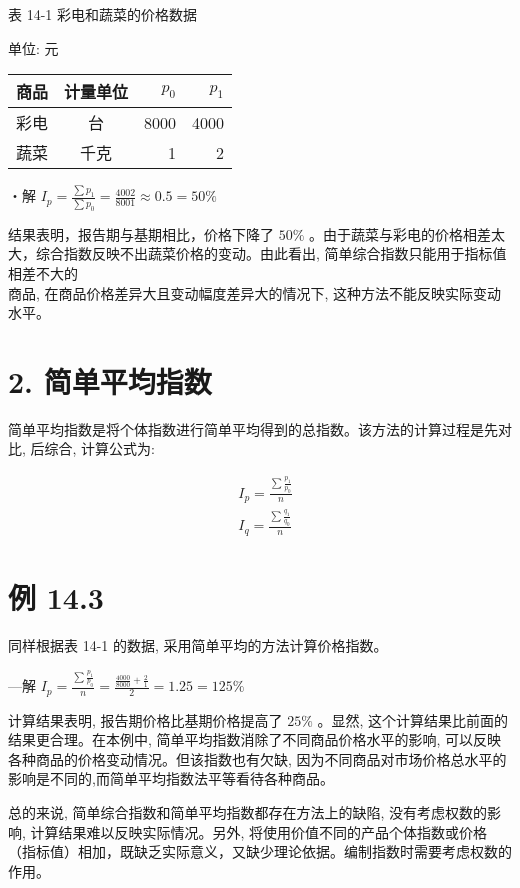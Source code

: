 \documentclass[10pt]{article}
\begin{document}
\begin{CJK*}{UTF8}{bsmi}
表 14-1 彩电和蔬菜的价格数据

单位: 元

\begin{center}
\begin{tabular}{rcrr}
\hline
商品 & 计量单位 & $p_{0}$ & $p_{1}$ \\
\hline
彩电 & 台 & 8000 & 4000 \\
蔬菜 & 千克 & 1 & 2 \\
\hline
\end{tabular}
\end{center}

・解 $I_{p}=\frac{\sum p_{1}}{\sum p_{0}}=\frac{4002}{8001} \approx 0.5=50 \%$

结果表明，报告期与基期相比，价格下降了 $50 \%$ 。由于蔬菜与彩电的价格相差太大，综合指数反映不出蔬菜价格的变动。由此看出, 简单综合指数只能用于指标值相差不大的\\
商品, 在商品价格差异大且变动幅度差异大的情况下, 这种方法不能反映实际变动水平。

\section*{2. 简单平均指数}
简单平均指数是将个体指数进行简单平均得到的总指数。该方法的计算过程是先对比, 后综合, 计算公式为:


\begin{align*}
& I_{p}=\frac{\sum \frac{p_{1}}{p_{0}}}{n}  \tag{14.3}\\
& I_{q}=\frac{\sum \frac{q_{1}}{q_{0}}}{n} \tag{14.4}
\end{align*}


\section*{例 14.3}
同样根据表 14-1 的数据, 采用简单平均的方法计算价格指数。

—解 $I_{p}=\frac{\sum \frac{p_{1}}{p_{0}}}{n}=\frac{\frac{4000}{8000}+\frac{2}{1}}{2}=1.25=125 \%$

计算结果表明, 报告期价格比基期价格提高了 $25 \%$ 。显然, 这个计算结果比前面的结果更合理。在本例中, 简单平均指数消除了不同商品价格水平的影响, 可以反映各种商品的价格变动情况。但该指数也有欠缺, 因为不同商品对市场价格总水平的影响是不同的,而简单平均指数法平等看待各种商品。

总的来说, 简单综合指数和简单平均指数都存在方法上的缺陷, 没有考虑权数的影响, 计算结果难以反映实际情况。另外, 将使用价值不同的产品个体指数或价格（指标值）相加，既缺乏实际意义，又缺少理论依据。编制指数时需要考虑权数的作用。


\end{CJK*}
\end{document}
